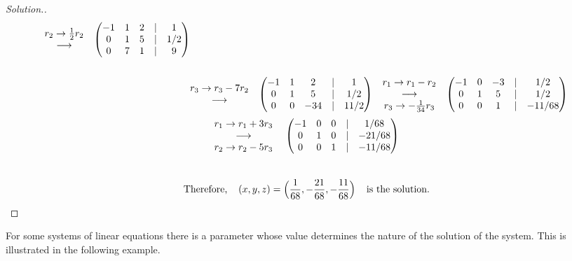 \documentclass[11pt,a4paper]{article}
\theoremstyle{definition}
\newenvironment{solution}
  {\renewcommand{\qedsymbol}{}\begin{proof}[\textit{Solution}.]}
  {\end{proof}}
\begin{document}
\begin{solution}
\begin{align*}
\hspace{0.3cm}
\begin{matrix}
r_2\rightarrow \frac{1}{2}r_2\\ \longrightarrow\\
\end{matrix}
\hspace{0.3cm}
\begin{pmatrix}
-1&1&2&|&1\\0&1&5&|&1/2\\0&7&1&|&9\\
\end{pmatrix}\\\\
&
\begin{matrix}
r_3\rightarrow r_3-7r_2\\ \longrightarrow\\
\end{matrix}
\hspace{0.3cm}
\begin{pmatrix}
-1&1&2&|&1\\0&1&5&|&1/2\\0&0&-34&|&11/2\\
\end{pmatrix}
\hspace{0.3cm}
\begin{matrix}
r_1\rightarrow r_1-r_2\\ \longrightarrow\\ r_3\rightarrow -\frac{1}{34}r_3\\
\end{matrix}
\hspace{0.3cm}
\begin{pmatrix}
-1&0&-3&|&1/2\\0&1&5&|&1/2\\0&0&1&|&-11/68\\
\end{pmatrix}\\
\end{align*}
$$
\begin{matrix}
r_1\rightarrow r_1+3r_3\\ \longrightarrow\\ r_2\rightarrow r_2-5r_3\\
\end{matrix}
\hspace{0.4cm}
\begin{pmatrix}
-1&0&0&|&1/68\\0&1&0&|&-21/68\\0&0&1&|&-11/68
\end{pmatrix}
$$\\
$$\text{Therefore,}\hspace{0.4cm}(x,y,z)=\Big(\frac{1}{68},-\frac{21}{68},-\frac{11}{68}\Big)\hspace{0.4cm}\text{is the solution.}$$
\end{solution}
For some systems of linear equations there is a parameter whose value determines the nature of the solution of the system. This is illustrated in the following example.
\end{document}
